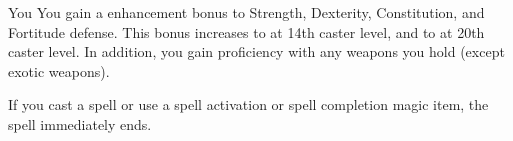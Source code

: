 \begin{spellheader}
    \spellrng{\rngpers}
    \spelldur{\durshort \dismissable}
\end{spellheader}
\begin{spelleffects}
    \begin{spelltarget}{You}
        \spelleffect You gain a  enhancement bonus to Strength, Dexterity, Constitution, and Fortitude defense. This bonus increases to  at 14th caster level, and to  at 20th caster level. In addition, you gain proficiency with any weapons you hold (except exotic weapons).
    \end{spelltarget}
\end{spelleffects}
\begin{spellfooter}
    \spellnotes If you cast a spell or use a spell activation or spell completion magic item, the spell immediately ends.
\end{spellfooter}

